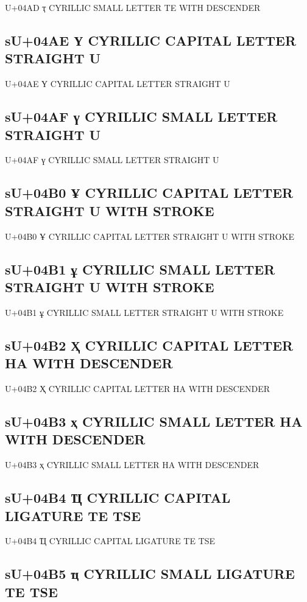 U+04AD ҭ  CYRILLIC SMALL LETTER TE WITH DESCENDER

\subsection{sU+04AE Ү  CYRILLIC CAPITAL LETTER STRAIGHT U}

U+04AE Ү  CYRILLIC CAPITAL LETTER STRAIGHT U

\subsection{sU+04AF ү  CYRILLIC SMALL LETTER STRAIGHT U}

U+04AF ү  CYRILLIC SMALL LETTER STRAIGHT U

\subsection{sU+04B0 Ұ  CYRILLIC CAPITAL LETTER STRAIGHT U WITH STROKE}

U+04B0 Ұ  CYRILLIC CAPITAL LETTER STRAIGHT U WITH STROKE

\subsection{sU+04B1 ұ  CYRILLIC SMALL LETTER STRAIGHT U WITH STROKE}

U+04B1 ұ  CYRILLIC SMALL LETTER STRAIGHT U WITH STROKE

\subsection{sU+04B2 Ҳ  CYRILLIC CAPITAL LETTER HA WITH DESCENDER}

U+04B2 Ҳ  CYRILLIC CAPITAL LETTER HA WITH DESCENDER

\subsection{sU+04B3 ҳ  CYRILLIC SMALL LETTER HA WITH DESCENDER}

U+04B3 ҳ  CYRILLIC SMALL LETTER HA WITH DESCENDER

\subsection{sU+04B4 Ҵ  CYRILLIC CAPITAL LIGATURE TE TSE}

U+04B4 Ҵ  CYRILLIC CAPITAL LIGATURE TE TSE

\subsection{sU+04B5 ҵ  CYRILLIC SMALL LIGATURE TE TSE}

